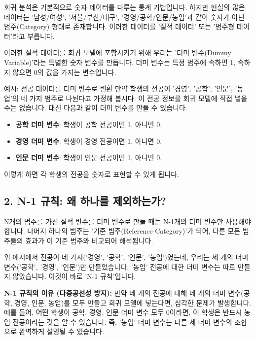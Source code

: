 \documentclass[11pt,a4paper]{article}
\begin{document}
회귀 분석은 기본적으로 숫자 데이터를 다루는 통계 기법입니다. 하지만 현실의 많은 데이터는 '남성/여성', '서울/부산/대구', '경영/공학/인문/농업'과 같이 숫자가 아닌 범주(Category) 형태로 존재합니다. 이러한 데이터를 '질적 데이터' 또는 '범주형 데이터'라고 부릅니다.

이러한 질적 데이터를 회귀 모델에 포함시키기 위해 우리는 '더미 변수(Dummy Variable)'라는 특별한 숫자 변수를 만듭니다. 더미 변수는 특정 범주에 속하면 1, 속하지 않으면 0의 값을 가지는 변수입니다.

\begin{example}{예시: 전공 데이터를 더미 변수로 변환}
만약 학생의 전공이 '경영', '공학', '인문', '농업'의 네 가지 범주로 나뉜다고 가정해 봅시다. 이 전공 정보를 회귀 모델에 직접 넣을 수는 없습니다. 대신 다음과 같이 더미 변수를 만들 수 있습니다.

\begin{itemize}
    \item \textbf{공학 더미 변수}: 학생이 공학 전공이면 1, 아니면 0.
    \item \textbf{경영 더미 변수}: 학생이 경영 전공이면 1, 아니면 0.
    \item \textbf{인문 더미 변수}: 학생이 인문 전공이면 1, 아니면 0.
\end{itemize}
이렇게 하면 각 학생의 전공을 숫자로 표현할 수 있게 됩니다.
\end{example}

\subsection*{2. N-1 규칙: 왜 하나를 제외하는가?}

\begin{tcolorbox}[definition={핵심 요약: N-1 규칙}]
N개의 범주를 가진 질적 변수를 더미 변수로 만들 때는 N-1개의 더미 변수만 사용해야 합니다. 나머지 하나의 범주는 '기준 범주(Reference Category)'가 되어, 다른 모든 범주들의 효과가 이 기준 범주와 비교되어 해석됩니다.
\end{tcolorbox}

위 예시에서 전공이 네 가지('경영', '공학', '인문', '농업')였는데, 우리는 세 개의 더미 변수('공학', '경영', '인문')만 만들었습니다. '농업' 전공에 대한 더미 변수는 따로 만들지 않았습니다. 이것이 바로 'N-1 규칙'입니다.

\textbf{N-1 규칙의 이유 (다중공선성 방지):}
만약 네 개의 전공에 대해 네 개의 더미 변수(공학, 경영, 인문, 농업)를 모두 만들고 회귀 모델에 넣는다면, 심각한 문제가 발생합니다. 예를 들어, 어떤 학생이 공학, 경영, 인문 더미 변수 모두 0이라면, 이 학생은 반드시 농업 전공이라는 것을 알 수 있습니다. 즉, '농업' 더미 변수는 다른 세 더미 변수의 조합으로 완벽하게 설명될 수 있습니다.
\end{document}
